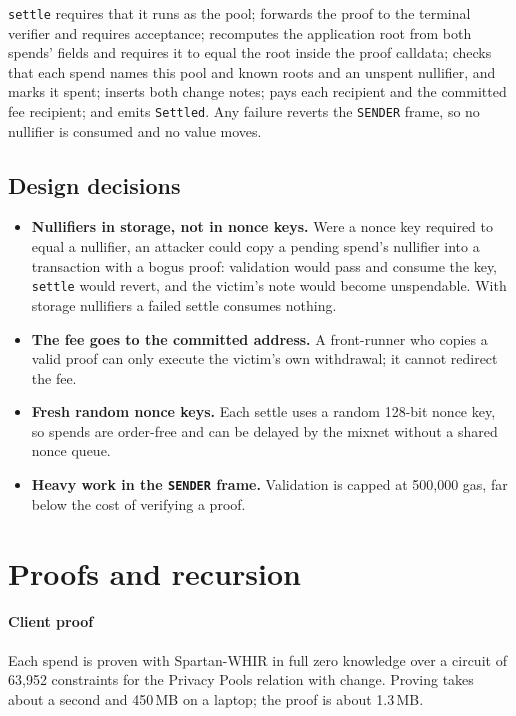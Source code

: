 \documentclass[11pt,a4paper]{article}
\newcommand{\code}[1]{\texttt{\small #1}}
\begin{document}
\noindent \code{settle} requires that it runs as the pool; forwards the proof to the terminal verifier
and requires acceptance; recomputes the application root from both spends' fields and requires it to
equal the root inside the proof calldata; checks that each spend names this pool and known roots and an
unspent nullifier, and marks it spent; inserts both change notes; pays each recipient and the committed
fee recipient; and emits \code{Settled}. Any failure reverts the \code{SENDER} frame, so no nullifier is
consumed and no value moves.

\subsection{Design decisions}
\begin{itemize}
  \item \textbf{Nullifiers in storage, not in nonce keys.} Were a nonce key required to equal a
    nullifier, an attacker could copy a pending spend's nullifier into a transaction with a bogus proof:
    validation would pass and consume the key, \code{settle} would revert, and the victim's note would
    become unspendable. With storage nullifiers a failed settle consumes nothing.
  \item \textbf{The fee goes to the committed address.} A front-runner who copies a valid proof can only
    execute the victim's own withdrawal; it cannot redirect the fee.
  \item \textbf{Fresh random nonce keys.} Each settle uses a random 128-bit nonce key, so spends are
    order-free and can be delayed by the mixnet without a shared nonce queue.
  \item \textbf{Heavy work in the \code{SENDER} frame.} Validation is capped at 500,000 gas, far below the
    cost of verifying a proof.
\end{itemize}

\section{Proofs and recursion}

\paragraph{Client proof} Each spend is proven with Spartan-WHIR in full zero knowledge over a circuit of
63,952 constraints for the Privacy Pools relation with change. Proving takes about a second and 450\,MB
on a laptop; the proof is about 1.3\,MB.
\end{document}
